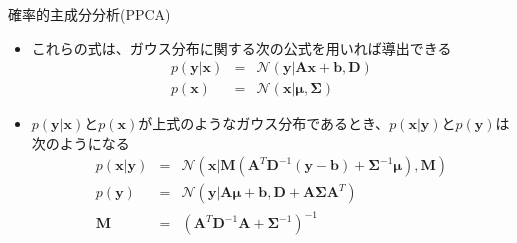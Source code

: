 \documentclass[dvipdfmx,notheorems,t]{beamer}
\begin{document}
\begin{frame}{確率的主成分分析(PPCA)}
\begin{itemize}
\begin{itemize}
		\item これらの式は、ガウス分布に関する次の公式を用いれば導出できる
		\begin{eqnarray}
			p(\bm{y} | \bm{x}) &=& \mathcal{N}(\bm{y} | \bm{A} \bm{x} + \bm{b}, \bm{D}) \\
			p(\bm{x}) &=& \mathcal{N}(\bm{x} | \bm{\mu}, \bm{\Sigma})
		\end{eqnarray}
		
		\item $p(\bm{y} | \bm{x})$と$p(\bm{x})$が上式のようなガウス分布であるとき、$p(\bm{x} | \bm{y})$と$p(\bm{y})$は次のようになる
		\begin{eqnarray}
			p(\bm{x} | \bm{y}) &=& \mathcal{N} \left( \bm{x} | \bm{M} \left( \bm{A}^T \bm{D}^{-1} (\bm{y} - \bm{b}) + \bm{\Sigma}^{-1} \bm{\mu} \right), \bm{M} \right) \\
			p(\bm{y}) &=& \mathcal{N}(\bm{y} | \bm{A} \bm{\mu} + \bm{b}, \bm{D} + \bm{A} \bm{\Sigma} \bm{A}^T) \\
			\bm{M} &=& \left( \bm{A}^T \bm{D}^{-1} \bm{A} + \bm{\Sigma}^{-1} \right)^{-1}
		\end{eqnarray}
	\end{itemize}
\end{itemize}

\end{frame}
\end{document}
